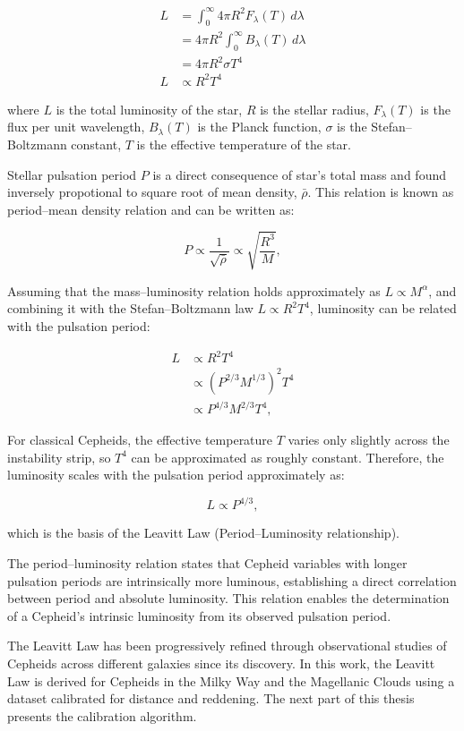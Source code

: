 \begin{align}
    L &= \int_{0}^{\infty} 4 \pi R^2 F_\lambda(T) \, d\lambda \\
      &= 4 \pi R^2 \int_{0}^{\infty} B_\lambda(T) \, d\lambda \\
      &= 4 \pi R^2 \sigma T^4 \\
   L  & \propto R^2  T^4
\end{align}

where $L$ is the total luminosity of the star, $R$ is the stellar radius, $F_\lambda(T)$ is the flux per unit wavelength,  $B_\lambda(T)$ is the Planck function, $\sigma$ is the Stefan--Boltzmann constant, $T$ is the effective temperature of the star.

Stellar pulsation period  $P$ is a direct consequence of star's total mass and found inversely propotional to square root of mean density, $\bar{\rho}$. This relation is known as period–mean density relation and can be written as:

\begin{equation}
    P \propto \frac{1}{\sqrt{\bar{\rho}}} \propto \sqrt{\frac{R^3}{M}},
\end{equation}

Assuming that the mass–luminosity relation holds approximately as $L \propto M^\alpha$, and combining it with the Stefan--Boltzmann law $L \propto R^2 T^4$, luminosity can be related with the pulsation period:

\begin{align}
    L &\propto R^2 T^4 \\
      &\propto \left(P^{2/3} M^{1/3}\right)^2 T^4 \\
      &\propto P^{4/3} M^{2/3} T^4,
\end{align}

For classical Cepheids, the effective temperature $T$ varies only slightly across the instability strip, so $T^4$ can be approximated as roughly constant. Therefore, the luminosity scales with the pulsation period approximately as:

\begin{equation}
    L \propto P^{4/3},
\end{equation}

which is the basis of the Leavitt Law (Period–Luminosity relationship). 

The period--luminosity relation states that Cepheid variables with longer pulsation periods are intrinsically more luminous, establishing a direct correlation between period and absolute luminosity. This relation enables the determination of a Cepheid's intrinsic luminosity from its observed pulsation period.

The Leavitt Law has been progressively refined through observational studies of Cepheids across different galaxies since its discovery. In this work, the Leavitt Law is derived for Cepheids in the Milky Way and the Magellanic Clouds using a dataset calibrated for distance and reddening. The next part of this thesis presents the calibration algorithm.

%

